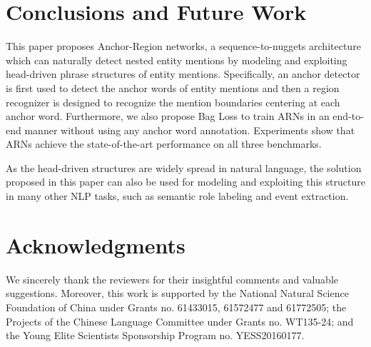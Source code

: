 \documentclass[11pt,a4paper]{article}
\begin{document}
\section{Conclusions and Future Work}
This paper proposes Anchor-Region networks, a sequence-to-nuggets architecture which can naturally detect nested entity mentions by modeling and exploiting head-driven phrase structures of entity mentions. Specifically, an anchor detector is first used to detect the anchor words of entity mentions and then a region recognizer is designed to recognize the mention boundaries centering at each anchor word. Furthermore, we also propose Bag Loss to train ARNs in an end-to-end manner without using any anchor word annotation. Experiments show that ARNs achieve the state-of-the-art performance on all three benchmarks.

As the head-driven structures are widely spread in natural language, the solution proposed in this paper can also be used for modeling and exploiting this structure in many other NLP tasks, such as semantic role labeling and event extraction.

\section*{Acknowledgments}

We sincerely thank the reviewers for their insightful comments and valuable suggestions. Moreover, this work is supported by the National Natural Science Foundation of China under Grants no. 61433015, 61572477 and 61772505; the Projects of the Chinese Language Committee under Grants no. WT135-24; and the Young Elite Scientists Sponsorship Program no. YESS20160177.



\end{document}
